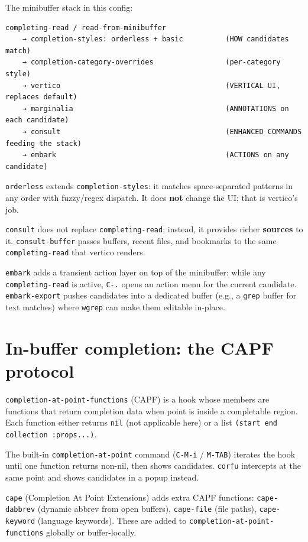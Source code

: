 The minibuffer stack in this config:

\begin{verbatim}
completing-read / read-from-minibuffer
    → completion-styles: orderless + basic          (HOW candidates match)
    → completion-category-overrides                 (per-category style)
    → vertico                                       (VERTICAL UI, replaces default)
    → marginalia                                    (ANNOTATIONS on each candidate)
    → consult                                       (ENHANCED COMMANDS feeding the stack)
    → embark                                        (ACTIONS on any candidate)
\end{verbatim}

\texttt{orderless} extends \texttt{completion-styles}: it matches space-separated patterns in any order with fuzzy/regex dispatch. It does \textbf{not} change the UI; that is vertico's job.

\texttt{consult} does not replace \texttt{completing-read}; instead, it provides richer \textbf{sources} to it. \texttt{consult-buffer} passes buffers, recent files, and bookmarks to the same \texttt{completing-read} that vertico renders.

\texttt{embark} adds a transient action layer on top of the minibuffer: while any \texttt{completing-read} is active, \texttt{C-.} opens an action menu for the current candidate. \texttt{embark-export} pushes candidates into a dedicated buffer (e.g., a \texttt{grep} buffer for text matches) where \texttt{wgrep} can make them editable in-place.

\section{In-buffer completion: the CAPF protocol}\label{in-buffer-completion-the-capf-protocol}

\texttt{completion-at-point-functions} (CAPF) is a hook whose members are functions that return completion data when point is inside a completable region. Each function either returns \texttt{nil} (not applicable here) or a list \texttt{(start end collection :props...)}.

The built-in \texttt{completion-at-point} command (\texttt{C-M-i} / \texttt{M-TAB}) iterates the hook until one function returns non-nil, then shows candidates. \texttt{corfu} intercepts at the same point and shows candidates in a popup instead.

\texttt{cape} (Completion At Point Extensions) adds extra CAPF functions: \texttt{cape-dabbrev} (dynamic abbrev from open buffers), \texttt{cape-file} (file paths), \texttt{cape-keyword} (language keywords). These are added to \texttt{completion-at-point-functions} globally or buffer-locally.

